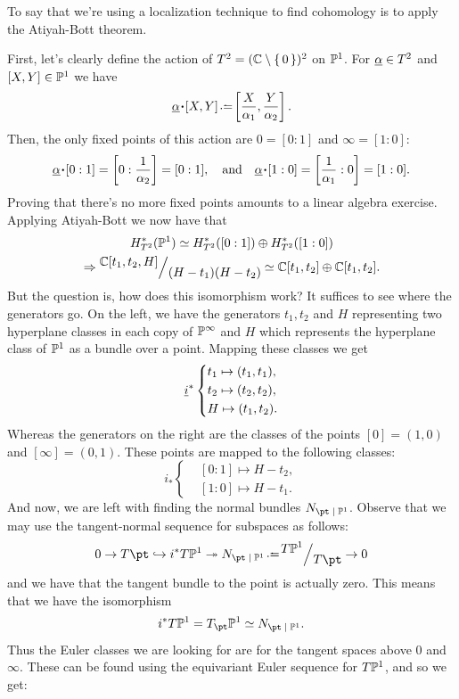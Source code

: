 \documentclass[12pt]{memoir}
\begin{document}
To say that we're using a localization technique to find cohomology is to apply the Atiyah-Bott theorem.

\begin{Ex}
First, let's clearly define the action of $T^2=(\mathbb{C}\setminus\{\,0\,\})^2$ on $\mathbb{P}^1$. For $\underline{\alpha}\in T^2$ and $[X,Y]\in\mathbb{P}^1$ we have
$$\un{\al}\.[X,Y]\defeq \bonj{\frac{X}{\al_1},\frac{Y}{\al_2}}.$$
Then, the only fixed points of this action are $0=[0:1]$ and $\infty=[1:0]$:
$$\un{\al}\.[0:1]=\bonj{0:\frac{1}{\al_2}}=[0:1],\word{and}\un{\al}\.[1:0]=\bonj{\frac{1}{\al_1}:0}=[1:0].$$
Proving that there's no more fixed points amounts to a linear algebra exercise. Applying Atiyah-Bott we now have that 
\begin{gather*}
    H_{T^2}^\ast(\bP^1)\isom H_{T^2}^\ast([0:1])\oplus H_{T^2}^\ast([1:0])\\
    \To\quot{\bC[t_1,t_2,H]}{(H-t_1)(H-t_2)}\isom \bC[t_1,t_2]\oplus\bC[t_1,t_2].
\end{gather*} But the question is, how does this isomorphism work? It suffices to see where the generators go. On the left, we have the generators $t_1, t_2$ and $H$ representing two hyperplane classes in each copy of $\mathbb{P}^\infty$ and $H$ which represents the hyperplane class of $\mathbb{P}^1$ as a bundle over a point. Mapping these classes we get
$$\underline i^\ast\left\lbrace
\begin{aligned}
    &t_1\mapsto (t_1,t_1),\\
    &t_2\mapsto (t_2,t_2),\\
    &H\mapsto (t_1,t_2).
\end{aligned}
\right.$$
Whereas the generators on the right are the classes of the points $[0]=(1,0)$ and $[\infty]=(0,1)$. These points are mapped to the following classes:
$$i_\ast\left\lbrace
\begin{aligned}
    &[0:1]\mapsto H-t_2,\\
    &[1:0]\mapsto H-t_1.
\end{aligned}
\right.$$
And now, we are left with finding the normal bundles $N_{\pt\mid\bP^1}$. Observe that we may use the tangent-normal sequence for subspaces as follows:
$$0\to T\pt\hookto i^\ast T\bP^1\onto N_{\pt\mid\bP^1}\defeq \quot{T\bP^1}{T\pt}\to0$$
and we have that the tangent bundle to the point is actually zero. This means that we have the isomorphism
$$i^\ast T\bP^1=T_{\pt}\bP^1\isom N_{\pt\mid\bP^1}.$$
Thus the Euler classes we are looking for are for the tangent spaces above $0$ and $\infty$. These can be found using the equivariant Euler sequence for $T\mathbb{P}^1$, and so we get:

\end{Ex}
\end{document}
